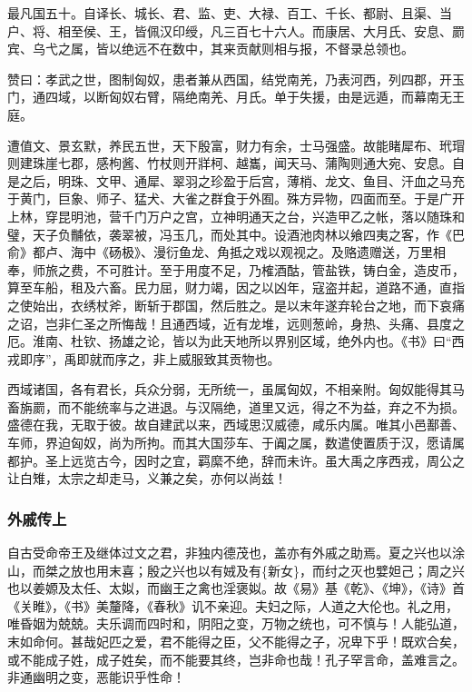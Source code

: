 \documentclass[]{article}
\begin{document}
最凡国五十。自译长、城长、君、监、吏、大禄、百工、千长、都尉、且渠、当户、将、相至侯、王，皆佩汉印绶，凡三百七十六人。而康居、大月氏、安息、罽宾、乌弋之属，皆以绝远不在数中，其来贡献则相与报，不督录总领也。

赞曰：孝武之世，图制匈奴，患者兼从西国，结党南羌，乃表河西，列四郡，开玉门，通四域，以断匈奴右臂，隔绝南羌、月氏。单于失援，由是远遁，而幕南无王庭。

遭值文、景玄默，养民五世，天下殷富，财力有余，士马强盛。故能睹犀布、玳瑁则建珠崖七郡，感枸酱、竹杖则开牂柯、越巂，闻天马、蒲陶则通大宛、安息。自是之后，明珠、文甲、通犀、翠羽之珍盈于后宫，薄梢、龙文、鱼目、汗血之马充于黄门，巨象、师子、猛犬、大雀之群食于外囿。殊方异物，四面而至。于是广开上林，穿昆明池，营千门万户之宫，立神明通天之台，兴造甲乙之帐，落以随珠和璧，天子负黼依，袭翠被，冯玉几，而处其中。设酒池肉林以飨四夷之客，作《巴俞》都卢、海中《砀极》、漫衍鱼龙、角抵之戏以观视之。及赂遗赠送，万里相奉，师旅之费，不可胜计。至于用度不足，乃榷酒酤，管盐铁，铸白金，造皮币，算至车船，租及六畜。民力屈，财力竭，因之以凶年，寇盗并起，道路不通，直指之使始出，衣绣杖斧，断斩于郡国，然后胜之。是以末年遂弃轮台之地，而下哀痛之诏，岂非仁圣之所悔哉！且通西域，近有龙堆，远则葱岭，身热、头痛、县度之厄。淮南、杜钦、扬雄之论，皆以为此天地所以界别区域，绝外内也。《书》曰``西戎即序''，禹即就而序之，非上威服致其贡物也。

西域诸国，各有君长，兵众分弱，无所统一，虽属匈奴，不相亲附。匈奴能得其马畜旃罽，而不能统率与之进退。与汉隔绝，道里又远，得之不为益，弃之不为损。盛德在我，无取于彼。故自建武以来，西域思汉威德，咸乐内属。唯其小邑鄯善、车师，界迫匈奴，尚为所拘。而其大国莎车、于阗之属，数遣使置质于汉，愿请属都护。圣上远览古今，因时之宜，羁縻不绝，辞而未许。虽大禹之序西戎，周公之让白雉，太宗之却走马，义兼之矣，亦何以尚兹！

\hypertarget{header-n6494}{%
\subsubsection{外戚传上}\label{header-n6494}}

自古受命帝王及继体过文之君，非独内德茂也，盖亦有外戚之助焉。夏之兴也以涂山，而桀之放也用末喜；殷之兴也以有娀及有\{新女\}，而纣之灭也嬖妲己；周之兴也以姜嫄及太任、太姒，而幽王之禽也淫褒姒。故《易》基《乾》、《坤》，《诗》首《关睢》，《书》美釐降，《春秋》讥不亲迎。夫妇之际，人道之大伦也。礼之用，唯昏姻为兢兢。夫乐调而四时和，阴阳之变，万物之统也，可不慎与！人能弘道，末如命何。甚哉妃匹之爱，君不能得之臣，父不能得之子，况卑下乎！既欢合矣，或不能成子姓，成子姓矣，而不能要其终，岂非命也哉！孔子罕言命，盖难言之。非通幽明之变，恶能识乎性命！
\end{document}
